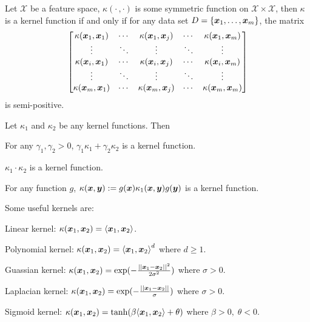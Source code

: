 \begin{thm}
    Let $\mathcal{X}$ be a feature space, $\kappa(\cdot\,, \cdot)$ is some symmetric function on 
    $\mathcal{X} \times \mathcal{X}$, then $\kappa$ is a kernel function if and only if for any data set
    $D = \{\boldsymbol{x}_1, \dotsc, \boldsymbol{x}_m\}$, the matrix
    \begin{equation*}
        \begin{bmatrix}
            \kappa(\boldsymbol{x}_1, \boldsymbol{x}_1) &\cdots &\kappa(\boldsymbol{x}_1, \boldsymbol{x}_j) &\cdots &\kappa(\boldsymbol{x}_1, \boldsymbol{x}_m)\\
            \vdots                   &\ddots &\vdots                   &\ddots &\vdots\\
            \kappa(\boldsymbol{x}_i, \boldsymbol{x}_1) &\cdots &\kappa(\boldsymbol{x}_i, \boldsymbol{x}_j) &\cdots &\kappa(\boldsymbol{x}_i, \boldsymbol{x}_m)\\
            \vdots                   &\ddots &\vdots                   &\ddots &\vdots\\
            \kappa(\boldsymbol{x}_m, \boldsymbol{x}_1) &\cdots &\kappa(\boldsymbol{x}_m, \boldsymbol{x}_j) &\cdots &\kappa(\boldsymbol{x}_m, \boldsymbol{x}_m)
        \end{bmatrix}
    \end{equation*}
    is semi-positive.
\end{thm}

\begin{prop}
    Let $\kappa_1$ and $\kappa_2$ be any kernel functions. Then
    \begin{compactenum}
        \item For any $\gamma_1, \gamma_2 > 0$, $\gamma_1 \kappa_1 + \gamma_2 \kappa_2$ is a kernel function.
        \item $\kappa_1 \cdot \kappa_2$ is a kernel function.
        \item For any function $g$, $\kappa(\boldsymbol{x}, \boldsymbol{y}) := g(\boldsymbol{x})\kappa_1(\boldsymbol{x}, \boldsymbol{y})g(\boldsymbol{y})$ is a 
        kernel function.
    \end{compactenum}
\end{prop}
Some useful kernels are:
\begin{compactenum}
    \item Linear kernel: $\kappa(\boldsymbol{x}_1, \boldsymbol{x}_2) = \langle \boldsymbol{x}_1, \boldsymbol{x}_2 \rangle$.
    \item Polynomial kernel: $\kappa(\boldsymbol{x}_1, \boldsymbol{x}_2) = {\langle \boldsymbol{x}_1, \boldsymbol{x}_2 \rangle}^d$ where 
    $d \geqslant 1$.
    \item Guassian kernel: $\kappa(\boldsymbol{x}_1, \boldsymbol{x}_2) = \exp(-\frac{||\boldsymbol{x}_1 - \boldsymbol{x}_2||^2}{2\sigma^2})$ where
    $\sigma > 0$.
    \item Laplacian kernel: $\kappa(\boldsymbol{x}_1, \boldsymbol{x}_2) = \exp(-\frac{||\boldsymbol{x}_1 - \boldsymbol{x}_2||}{\sigma})$ where
    $\sigma > 0$.
    \item Sigmoid kernel: $\kappa(\boldsymbol{x}_1, \boldsymbol{x}_2) = \tanh(\beta \langle \boldsymbol{x}_1, \boldsymbol{x}_2\rangle + \theta)$
    where $\beta > 0,\;\theta < 0$.
\end{compactenum}